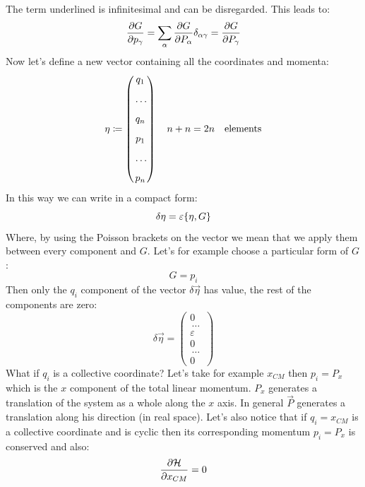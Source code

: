 The term underlined is infinitesimal and can be disregarded. This leads to:
\begin{equation}
    \pdv{G}{p_{\gamma}} = \bigsum_{\alpha} \pdv{G}{P_{\alpha}}\delta_{\alpha \gamma} = \pdv{G}{P_{\gamma}}
\end{equation}
Now let's define a new vector containing all the coordinates and momenta:
\begin{equation}
    \vb{\eta} \coloneqq \begin{pmatrix}
        q_1\\[8pt] \,\dots\, \\[8pt]q_n\\[8pt]p_1\\[8pt] \,\dots\, \\[8pt]p_n
    \end{pmatrix}
    \quad n+n = 2n \quad \text{elements}
\end{equation}
In this way we can write in a compact form:
\begin{equation}
    \delta \vec{\eta} = \varepsilon \pb{\eta}{G}
\end{equation}
Where, by using the Poisson brackets on the vector we mean that we apply them between every component and $G$. Let's for example choose a particular form of $G$:
\begin{equation}
    G = p_i
\end{equation}
Then only the $q_i$ component of the vector $\delta \vec{\eta}$ has value, the rest of the components are zero:
\begin{equation}
    \delta \vec{\eta} = \begin{pmatrix}
        0\\[8pt] \,\dots\, \\[8pt]\varepsilon\\[8pt]0\\[8pt] \,\dots\, \\[8pt]0
    \end{pmatrix}
\end{equation}
What if $q_i$ is a collective coordinate? Let's take for example $x_{CM}$ then $p_i = P_x$ which is the $x$ component of the total linear momentum. $P_x$ generates a translation of the system as a whole along the $x$ axis. In general $\vec{P}$ generates a translation along his direction (in real space). Let's also notice that if $q_i = x_{CM}$ is a collective coordinate and is cyclic then its corresponding momentum $p_i = P_x$ is conserved and also:
\begin{equation}
  \pdv{\hamfun}{x_{CM}}=0
\end{equation}

